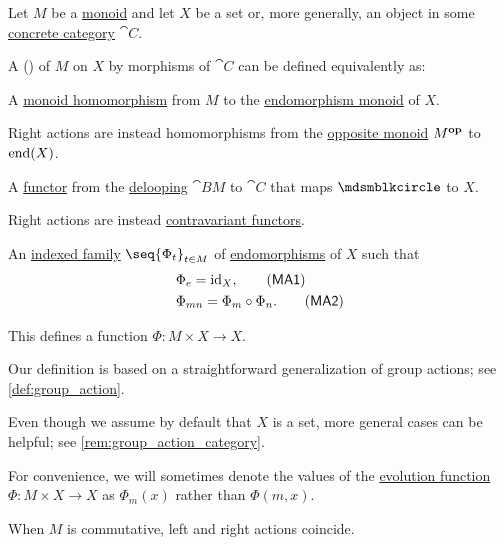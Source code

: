 \begin{definition}\label{def:monoid_action}\mimprovised
  Let \( M \) be a \hyperref[def:monoid]{monoid} and let \( X \) be a set or, more generally, an object in some \hyperref[def:concrete_category]{concrete category} \( \cat{C} \).

  A ()  of \( M \) on \( X \) by morphisms of \( \cat{C} \) can be defined equivalently as:
  \begin{thmenum}
     A \hyperref[def:monoid/homomorphism]{monoid homomorphism} from \( M \) to the \hyperref[def:endomorphism_monoid]{endomorphism monoid} of \( X \).

    Right actions are instead homomorphisms from the \hyperref[def:monoid/opposite]{opposite monoid} \( M^\oppos \) to \( \operatorname{end}(X) \).

     A \hyperref[def:functor]{functor} from the \hyperref[def:monoid_delooping]{delooping} \( \cat{B} M \) to \( \cat{C} \) that maps \( \Anon \) to \( X \).

    Right actions are instead \hyperref[rem:contravariant_functor]{contravariant functors}.

     An \hyperref[def:indexed_family]{indexed family} \( \seq{ \Phi_t }_{t \in M} \) of \hyperref[def:morphism_invertibility/endomorphism]{endomorphisms} of \( X \) such that
    \begin{align}
      &\Phi_e = \id_X,                     \label{eq:def:monoid_action/family/identity}\tag{\logic{MA1}} \\
      &\Phi_{mn} = \Phi_m \bincirc \Phi_n. \label{eq:def:monoid_action/family/compatibility}\tag{\logic{MA2}}
    \end{align}

    This defines a function \( \Phi: M \times X \to X \).
  \end{thmenum}
\end{definition}
\begin{comments}
  \item Our definition is based on a straightforward generalization of group actions; see \cref{def:group_action}.
  \item Even though we assume by default that \( X \) is a set, more general cases can be helpful; see \cref{rem:group_action_category}.
  \item For convenience, we will sometimes denote the values of the \hyperref[def:monoid_action]{evolution function} \( \Phi: M \times X \to X \) as \( \Phi_m(x) \) rather than \( \Phi(m, x) \).

  \item When \( M \) is commutative, left and right actions coincide.
\end{comments}
